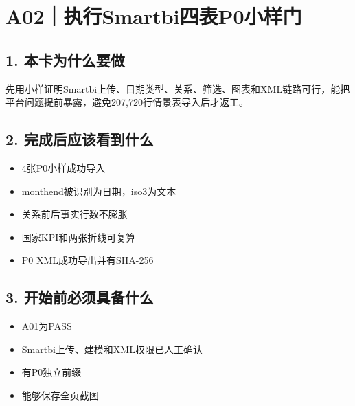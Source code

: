 \documentclass[UTF8,openany,zihao=-4]{ctexbook}
\renewcommand{\_}{\textunderscore\allowbreak}
\begin{document}
\clearpage
\section{A02｜执行Smartbi四表P0小样门}
\subsection*{1. 本卡为什么要做}
先用小样证明Smartbi上传、日期类型、关系、筛选、图表和XML链路可行，能把平台问题提前暴露，避免207,720行情景表导入后才返工。


\subsection*{2. 完成后应该看到什么}
\begin{itemize}
\item 4张P0小样成功导入
\item month\_end被识别为日期，iso3为文本
\item 关系前后事实行数不膨胀
\item 国家KPI和两张折线可复算
\item P0 XML成功导出并有SHA-256
\end{itemize}

\subsection*{3. 开始前必须具备什么}
\begin{itemize}[label=$\square$]
\item A01为PASS
\item Smartbi上传、建模和XML权限已人工确认
\item 有P0独立前缀
\item 能够保存全页截图
\end{itemize}
\end{document}
